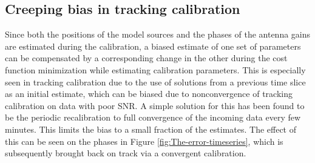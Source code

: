 \documentclass{aa}
\begin{document}
\subsection{Creeping bias in tracking calibration}

Since both  the positions  of the  model sources and the phases  of the
antenna gains are estimated during the calibration, a biased estimate of one set
of parameters can  be compensated by a corresponding change  in the other during
the cost function minimization  while estimating calibration parameters. This is
especially  seen in  tracking calibration  due to  the use  of solutions  from a
previous  time slice  as  an  initial  estimate,  which  can  be  biased  due  to
nonconvergence  of  tracking calibration  on  data  with  poor SNR.   A  simple
solution  for this  has been  found  to be  the periodic  recalibration to  full
convergence of  the incoming data every few  minutes. This limits the  bias to a
small fraction of the  estimates.  The effect of this can be  seen on the phases
in  Figure \ref{fig:The-error-timeseries}, which is subsequently  brought  back on
track via a convergent calibration.




\end{document}
